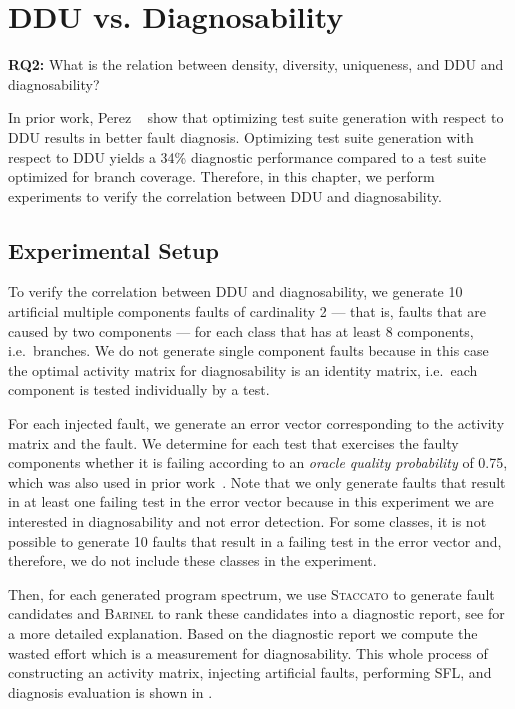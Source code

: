 \documentclass[twoside,a4paper,11pt]{memoir}
\begin{document}
\chapter{DDU vs. Diagnosability}%
\label{ch:rq2}
\begin{framed}
\noindent
\textbf{RQ2:} What is the relation between density, diversity, uniqueness, and DDU and diagnosability?
\end{framed}
In prior work, Perez \etal~\cite{DBLP:conf/icse/PerezAD17} show that optimizing test suite generation with respect to DDU results in better fault diagnosis.
Optimizing test suite generation with respect to DDU yields a 34\% diagnostic performance compared to a test suite optimized for branch coverage.
Therefore, in this chapter, we perform experiments to verify the correlation between DDU and diagnosability.

\section{Experimental Setup}%
\label{sec:rq2_experimental_setup}
To verify the correlation between DDU and diagnosability, we generate 10 artificial multiple components faults of cardinality 2 --- that is, faults that are caused by two components --- for each class that has at least 8 components, i.e.\ branches.
We do not generate single component faults because in this case the optimal activity matrix for diagnosability is an identity matrix, i.e.\ each component is tested individually by a test.

For each injected fault, we generate an error vector corresponding to the activity matrix and the fault.
We determine for each test that exercises the faulty components whether it is failing according to an \emph{oracle quality probability} of 0.75, which was also used in prior work~\cite{DBLP:conf/icse/PerezAD17}.
Note that we only generate faults that result in at least one failing test in the error vector because in this experiment we are interested in diagnosability and not error detection.
For some classes, it is not possible to generate 10 faults that result in a failing test in the error vector and, therefore, we do not include these classes in the experiment.

Then, for each generated program spectrum, we use \textsc{Staccato} to generate fault candidates and \textsc{Barinel} to rank these candidates into a diagnostic report, see  for a more detailed explanation.
Based on the diagnostic report we compute the wasted effort which is a measurement for diagnosability.
This whole process of constructing an activity matrix, injecting artificial faults, performing SFL, and diagnosis evaluation is shown in .
\end{document}

